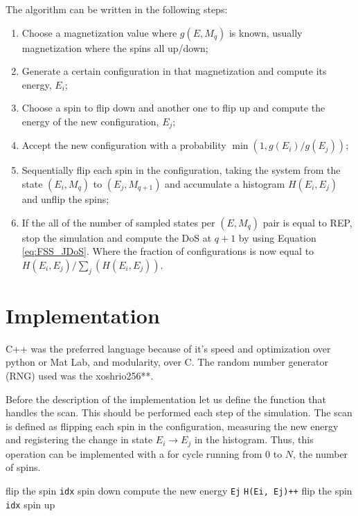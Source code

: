 The algorithm can be written in the following steps:
\begin{enumerate}
\item Choose a magnetization value where $g(E, M_q)$ is known, usually magnetization where the spins all up/down;
\item Generate a certain configuration in that magnetization and compute its energy, $E_i$;                                                                                                                                       
\item Choose a spin to flip down and another one to flip up and compute the energy of the new configuration, $E_j$;
\item Accept the new configuration with a probability $\min(1, g(E_i)/g(E_j))$;
\item Sequentially flip each spin in the configuration, taking the system from the state $(E_i, M_q)$ to $(E_j, M_{q+1})$ and accumulate a histogram $H(E_i, E_j)$ and unflip the spins;
\item If the all of the number of sampled states per $(E,M_{q})$ pair is equal to REP, stop the simulation and compute the DoS at $q+1$ by using Equation \ref{eq:FSS_JDoS}. Where the fraction of configurations is now equal to $H(E_i, E_j)/\sum_j(H(E_i,E_j))$.
\end{enumerate}

\section{Implementation}

	C++ was the preferred language because of it's speed and optimization over python or Mat Lab, and modularity, over C. The random number generator (RNG) used was the xoshrio256**.

	Before the description of the implementation let us define the function that handles the scan. This should be performed each step of the simulation. The scan is defined as flipping each spin in the configuration, measuring the new energy and registering the change in state $E_i \rightarrow E_j$ in the histogram. Thus, this operation can be implemented with a for cycle running from $0$ to $N$, the number of spins.
\begin{algorithm}
	\begin{algorithmic}[1]
			\State flip the spin \texttt{idx} spin down
			\State compute the new energy \texttt{Ej}
			\State \texttt{H(Ei, Ej)++}
			\State flip the spin \texttt{idx} spin up
		\EndFor
	\EndFunction
	\end{algorithmic} 
\end{algorithm} 

